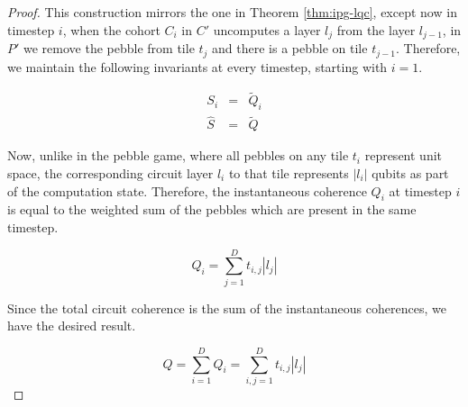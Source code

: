 \begin{proof}
This construction mirrors the one in Theorem \ref{thm:ipg-lqc},
except now in timestep $i$, when the cohort $C_i$ in $C'$ uncomputes a layer $l_j$
from the layer $l_{j-1}$, in $P'$ we remove the pebble from tile $t_j$
and there is a pebble on tile $t_{j-1}$. Therefore, we maintain the
following invariants at every timestep, starting with $i=1$.

\begin{eqnarray}
        S_i & = & \tilde{Q}_i \\
\hat{S} & = & \tilde{Q}
\end{eqnarray}

Now, unlike in the pebble game, where all pebbles on any tile $t_i$
represent unit space, the corresponding circuit layer $l_i$ to that tile
represents $|l_i|$ qubits as part of the computation state. Therefore,
the instantaneous coherence $Q_i$ at timestep $i$ is equal to the
weighted sum of the pebbles which are present in the same timestep.

\begin{equation}
Q_i = \sum_{j=1}^{D} t_{i,j} |l_j|
\end{equation}

Since the total circuit coherence is the sum of the instantaneous coherences,
we have the desired result.

\begin{equation}
Q = \sum_{i=1}^D Q_i = \sum_{i,j=1}^D t_{i,j} |l_j| 
\end{equation}
\end{proof}